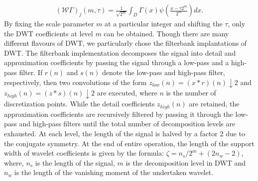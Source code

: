 \documentclass{article}
\begin{document}
\begin{equation}
    \begin{aligned}
        (\mathcal{W} \Gamma)_{j}(m, \tau)=\frac{1}{\sqrt{2^{m}}} \int_{D} \Gamma (x) \psi\left(\frac{x-\tau 2^{m}}{2^{m}}\right) dx.
    \end{aligned}
\end{equation}
By fixing the scale parameter $m$ at a particular integer and shifting the $\tau$, only the DWT coefficients at level $m$ can be obtained. Though there are many different flavours of DWT, we particularly chose the filterbank implantations of DWT. The filterbank implementation decomposes the signal into detail and approximation coefficients by passing the signal through a low-pass and a high-pass filter. If $r(n)$ and $s(n)$ denote the low-pass and high-pass filter, respectively, then two convolutions of the form $z_{low}(n) = (x*r)(n) \downarrow 2$ and $z_{high}(n) = (z*s)(n) \downarrow 2$ are executed, where $n$ is the number of discretization points. While the detail coefficients $z_{high}(n)$ are retained, the approximation coefficients are recursively filtered by passing it through the low-pass and high-pass filters until the total number of decomposition levels are exhausted. At each level, the length of the signal is halved by a factor 2 due to the conjugate symmetry. At the end of entire operation, the length of the support width of wavelet coefficients is given by the formula: $\zeta = n_{s}/2^m + (2n_{w}-2)$, where, $n_{s}$ is the length of the signal, $m$ is the decomposition level in DWT and $n_{w}$ is the length of the vanishing moment of the undertaken wavelet.
\end{document}
